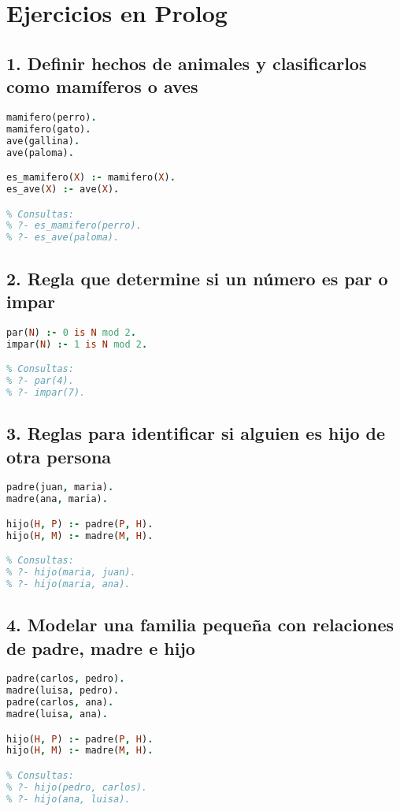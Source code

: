 \documentclass[12pt]{article}
\begin{document}
\newpage
\section*{Ejercicios en Prolog}

\subsection*{1. Definir hechos de animales y clasificarlos como mamíferos o aves}
\begin{lstlisting}[language=Prolog]
mamifero(perro).
mamifero(gato).
ave(gallina).
ave(paloma).

es_mamifero(X) :- mamifero(X).
es_ave(X) :- ave(X).

% Consultas:
% ?- es_mamifero(perro).
% ?- es_ave(paloma).
\end{lstlisting}

\subsection*{2. Regla que determine si un número es par o impar}
\begin{lstlisting}[language=Prolog]
par(N) :- 0 is N mod 2.
impar(N) :- 1 is N mod 2.

% Consultas:
% ?- par(4).
% ?- impar(7).
\end{lstlisting}

\subsection*{3. Reglas para identificar si alguien es hijo de otra persona}
\begin{lstlisting}[language=Prolog]
padre(juan, maria).
madre(ana, maria).

hijo(H, P) :- padre(P, H).
hijo(H, M) :- madre(M, H).

% Consultas:
% ?- hijo(maria, juan).
% ?- hijo(maria, ana).
\end{lstlisting}

\subsection*{4. Modelar una familia pequeña con relaciones de padre, madre e hijo}
\begin{lstlisting}[language=Prolog]
padre(carlos, pedro).
madre(luisa, pedro).
padre(carlos, ana).
madre(luisa, ana).

hijo(H, P) :- padre(P, H).
hijo(H, M) :- madre(M, H).

% Consultas:
% ?- hijo(pedro, carlos).
% ?- hijo(ana, luisa).
\end{lstlisting}
\end{document}
